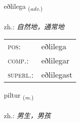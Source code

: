 \documentclass[frontgrid, backgrid]{flacards}\usepackage[]{graphicx}\usepackage[]{xcolor}
\begin{document}
\renewcommand{\flhead}{\vskip5pt \fboxsep=0pt {\small\bfseries\footnotesize Atviksorð | 副词}}
\renewcommand{\fcfoot}{\vskip5pt \fboxsep=0pt \hspace{2pt}{\small\bfseries\footnotesize 3K}}

\renewcommand{\blhead}{\vskip5pt {\small\bfseries\footnotesize Atviksorð | 副词 }}
\renewcommand{\bcfoot}{\vskip5pt \hspace{2pt}{\small\bfseries\footnotesize 3K}}


{eðlilega \small{\textsubscript{(\textit{adv.})}} \\[1ex] %
\textphonetic{[ɛðlɪlɛɣa]} \\
zh.: \emph{自然地，通常地} \\  [2ex]
\renewcommand*{\arraystretch}{0.8}
\begin{tabular}{ll}
\textsc{pos}: & eðlilega \\ 
\textsc{comp.}: & eðlilegar \\ 
\textsc{superl.}: & eðlilegast \\
\end{tabular}
}

\renewcommand{\flhead}{\vskip5pt \fboxsep=0pt {\small\bfseries\footnotesize Nafnorð | 名词}}
\renewcommand{\fcfoot}{\vskip5pt \fboxsep=0pt \hspace{2pt}{\small\bfseries\footnotesize 3K}}

\renewcommand{\blhead}{\vskip5pt {\small\bfseries\footnotesize Nafnorð | 名词 }}
\renewcommand{\bcfoot}{\vskip5pt \hspace{2pt}{\small\bfseries\footnotesize 3K}}


{piltur \small{\textsubscript{(\textit{m.})}} \\[1ex] %
 \\
zh.: \emph{男生，男孩} \\  [2ex]
\renewcommand*{\arraystretch}{0.8}
}
\end{document}

